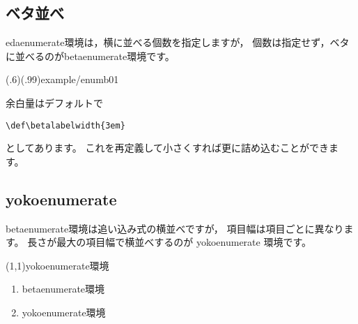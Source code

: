 \documentclass[a4j]{jarticle}
\begin{document}
\subsection{ベタ並べ}
\textsf{edaenumerate}環境は，横に並べる個数を指定しますが，
個数は指定せず，ベタに並べるのが\textsf{betaenumerate}環境です。

\showexample[betaenumerate](.6)(.99){example/enumb01}

余白量はデフォルトで
\begin{jquote}
\begin{verbatim}
\def\betalabelwidth{3em}
\end{verbatim}
\end{jquote}
としてあります。
これを再定義して小さくすれば更に詰め込むことができます。
\clearpage

\subsection{\textsf{yokoenumerate}}
\textsf{betaenumerate}環境は追い込み式の横並べですが，
項目幅は項目ごとに異なります。
長さが最大の項目幅で横並べするのが \textsf{yokoenumerate} 環境です。

\begin{showEx}(1,1){\textsf{yokoenumerate}環境}
\begin{enumerate}[1.~]
\item \textsf{betaenumerate}環境

\item \textsf{yokoenumerate}環境
\end{enumerate}
\end{showEx}
\end{document}
